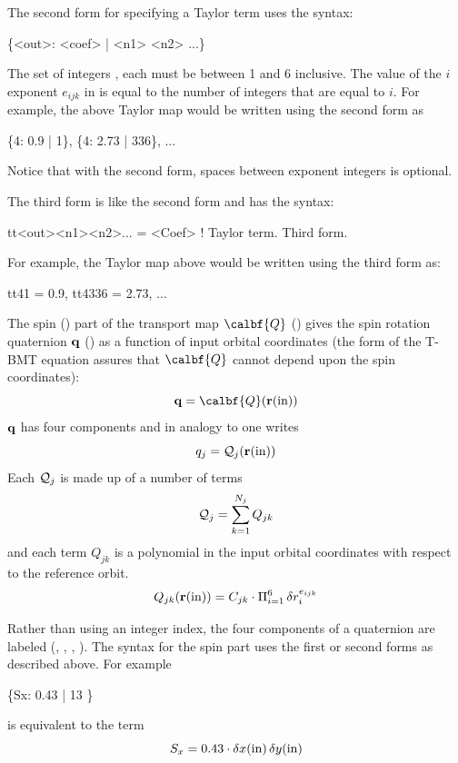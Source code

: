 {The second form for specifying a Taylor term uses the syntax:
\begin{example}
  \{<out>: <coef> | <n1> <n2> ...\}
\end{example}
The set of integers ,  each must be between 1 and 6 inclusive. The value of the
$i$\Th exponent $e_{ijk}$ in  is equal to the number of integers that are equal to $i$. For
example, the above Taylor map would be written using the second form as
\begin{example}
  \{4: 0.9 | 1\}, \{4: 2.73 | 336\}, ...
\end{example}
Notice that with the second form, spaces between exponent integers is optional.

The third form is like the second form and has the syntax:
\begin{example}
  tt<out><n1><n2>...  = <Coef>                      ! Taylor term. Third form.
\end{example}
For example, the Taylor map above would be written using the third form as:
\begin{example}
  tt41 = 0.9, tt4336 = 2.73, ...
\end{example}

The spin () part of the transport map $\calbf{Q}$ () gives the
spin rotation quaternion ${\bf q}$ () as a function of input orbital coordinates (the form of the
T-BMT equation assures that $\calbf{Q}$ cannot depend upon the spin coordinates):
\begin{equation}
  \bfq = \calbf{Q}(\bfr(\In))
\end{equation}
${\bf q}$ has four components and in analogy to  one writes
\begin{equation}
  q_j = {\cal Q}_j({\bf r}({\text{in}}))
  \label{qqr}
\end{equation}
Each ${\cal Q}_j$ is made up of a number of terms
\begin{equation}
  {\cal Q}_j = \sum_{k = 1}^{N_j} Q_{jk}
\end{equation}
and each term $Q_{jk}$ is a polynomial in the input orbital coordinates with respect to the reference orbit.
\begin{equation}
  Q_{jk}({\bf r}({\text{in}})) = C_{jk} \cdot \Pi_{i = 1}^6 \, \delta r_i^{e_{ijk}}
  \label{qcpd}
\end{equation}

Rather than using an integer index, the four components of a quaternion are labeled (,
, , ). The syntax for the spin part uses the first or second forms as
described above. For example
\begin{example}
  \{Sx: 0.43 | 13 \}
\end{example}
is equivalent to the term
\begin{equation}
  S_x = 0.43 \cdot \delta x({\text{in}}) \, \delta y({\text{in}})
\end{equation}

}

